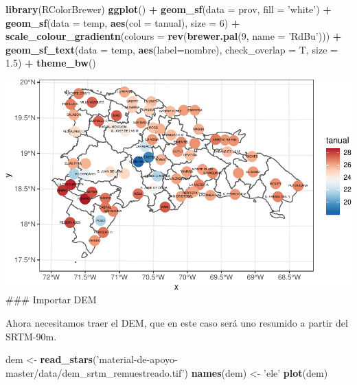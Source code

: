 \documentclass[11pt,]{article}
\newenvironment{Shaded}{\begin{snugshade}}{\end{snugshade}}
\newcommand{\KeywordTok}[1]{\textcolor[rgb]{0.13,0.29,0.53}{\textbf{#1}}}
\newcommand{\DataTypeTok}[1]{\textcolor[rgb]{0.13,0.29,0.53}{#1}}
\newcommand{\DecValTok}[1]{\textcolor[rgb]{0.00,0.00,0.81}{#1}}
\newcommand{\FloatTok}[1]{\textcolor[rgb]{0.00,0.00,0.81}{#1}}
\newcommand{\StringTok}[1]{\textcolor[rgb]{0.31,0.60,0.02}{#1}}
\newcommand{\OperatorTok}[1]{\textcolor[rgb]{0.81,0.36,0.00}{\textbf{#1}}}
\newcommand{\NormalTok}[1]{#1}
\begin{document}
\begin{Shaded}
\begin{Highlighting}[]
\KeywordTok{library}\NormalTok{(RColorBrewer)}
\KeywordTok{ggplot}\NormalTok{() }\OperatorTok{+}
\StringTok{  }\KeywordTok{geom_sf}\NormalTok{(}\DataTypeTok{data =}\NormalTok{ prov, }\DataTypeTok{fill =} \StringTok{'white'}\NormalTok{) }\OperatorTok{+}
\StringTok{  }\KeywordTok{geom_sf}\NormalTok{(}\DataTypeTok{data =}\NormalTok{ temp, }\KeywordTok{aes}\NormalTok{(}\DataTypeTok{col =}\NormalTok{ tanual), }\DataTypeTok{size =} \DecValTok{6}\NormalTok{) }\OperatorTok{+}\StringTok{ }
\StringTok{  }\KeywordTok{scale_colour_gradientn}\NormalTok{(}\DataTypeTok{colours =} \KeywordTok{rev}\NormalTok{(}\KeywordTok{brewer.pal}\NormalTok{(}\DecValTok{9}\NormalTok{, }\DataTypeTok{name =} \StringTok{'RdBu'}\NormalTok{))) }\OperatorTok{+}
\StringTok{  }\KeywordTok{geom_sf_text}\NormalTok{(}\DataTypeTok{data =}\NormalTok{ temp, }\KeywordTok{aes}\NormalTok{(}\DataTypeTok{label=}\NormalTok{nombre), }\DataTypeTok{check_overlap =}\NormalTok{ T, }\DataTypeTok{size =} \FloatTok{1.5}\NormalTok{) }\OperatorTok{+}
\StringTok{  }\KeywordTok{theme_bw}\NormalTok{()}
\end{Highlighting}
\end{Shaded}

\includegraphics{proyecto_files/figure-latex/mapa-temp-1.pdf} \#\#\#
Importar DEM

Ahora necesitamos traer el DEM, que en este caso será uno resumido a
partir del SRTM-90m.

\begin{Shaded}
\begin{Highlighting}[]
\NormalTok{dem <-}\StringTok{ }\KeywordTok{read_stars}\NormalTok{(}\StringTok{'material-de-apoyo-master/data/dem_srtm_remuestreado.tif'}\NormalTok{)}
\KeywordTok{names}\NormalTok{(dem) <-}\StringTok{ 'ele'}
\KeywordTok{plot}\NormalTok{(dem)}
\end{Highlighting}
\end{Shaded}
\end{document}
